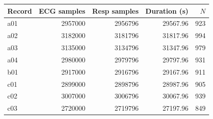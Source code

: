 \begin{tabular}{lrrrr}
\toprule
Record & ECG samples & Resp samples & Duration (s) & $N$ \\
\midrule
a01 & 2957000 & 2956796 & 29567.96 & 923 \\
a02 & 3182000 & 3181796 & 31817.96 & 994 \\
a03 & 3135000 & 3134796 & 31347.96 & 979 \\
a04 & 2980000 & 2979796 & 29797.96 & 931 \\
b01 & 2917000 & 2916796 & 29167.96 & 911 \\
c01 & 2899000 & 2898796 & 28987.96 & 905 \\
c02 & 3007000 & 3006796 & 30067.96 & 939 \\
c03 & 2720000 & 2719796 & 27197.96 & 849 \\
\bottomrule
\end{tabular}
